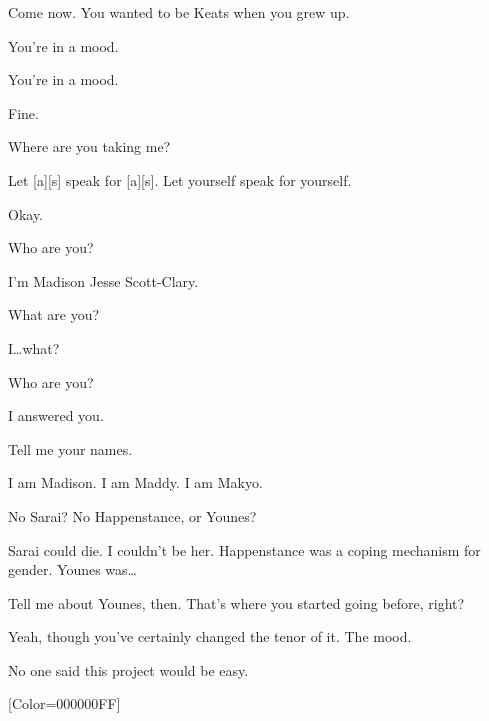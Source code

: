 \begin{paracol}{2}
\begin{leftcolumn}
\begin{ally}
Come now. You wanted to be Keats when you grew up.
\end{ally}
You're in a mood.

\begin{ally}
You're in a mood.
\end{ally}
Fine.

Where are you taking me?

\begin{ally}
Let {[}a{]}{[}s{]} speak for {[}a{]}{[}s{]}. Let yourself speak for yourself.
\end{ally}
Okay.
\newpage



\begin{ally}
Who are you?
\end{ally}
I'm Madison Jesse Scott-Clary.

\begin{ally}
What are you?
\end{ally}
I\ldots{}what?

\begin{ally}
Who are you?
\end{ally}
I answered you.

\begin{ally}
Tell me your names.
\end{ally}
I am Madison. I am Maddy. I am Makyo.

\begin{ally}
No Sarai? No Happenstance, or Younes?
\end{ally}
Sarai could die. I couldn't be her. Happenstance was a coping mechanism for gender. Younes was\ldots{}

\begin{ally}
Tell me about Younes, then. That's where you started going before, right?
\end{ally}
Yeah, though you've certainly changed the tenor of it. The mood.

\begin{ally}
No one said this project would be easy.
\end{ally}
\newpage
\end{leftcolumn}
\end{paracol}
\resetbackgroundcolor
\renewfontfamily{}[Color=000000FF]

